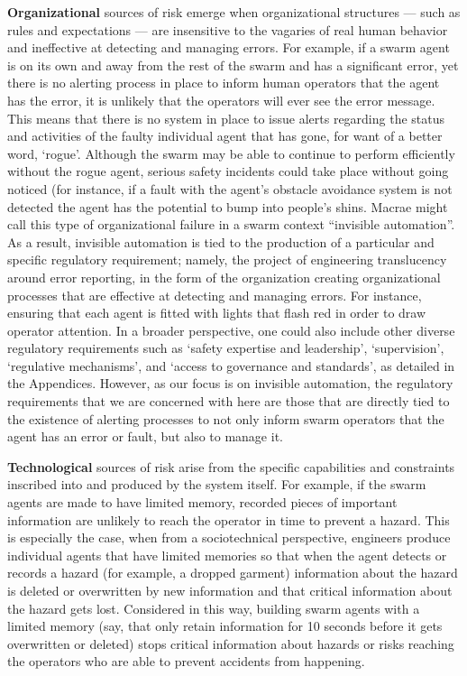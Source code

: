 \documentclass[lettersize,journal]{IEEEtran}
\begin{document}
\textbf{Organizational} sources of risk emerge when organizational structures — such as rules and expectations — are insensitive to the vagaries of real human behavior and ineffective at detecting and managing errors. For example, if a swarm agent is on its own and away from the rest of the swarm and has a significant error, yet there is no alerting process in place to inform human operators that the agent has the error, it is unlikely that the operators will ever see the error message. This means that there is no system in place to issue alerts regarding the status and activities of the faulty individual agent that has gone, for want of a better word, `rogue’. Although the swarm may be able to continue to perform efficiently without the rogue agent, serious safety incidents could take place without going noticed (for instance, if a fault with the agent’s obstacle avoidance system is not detected the agent has the potential to bump into people’s shins. Macrae \cite{macrae2021learning} might call this type of organizational failure in a swarm context ``invisible automation”. As a result, invisible automation is tied to the production of a particular and specific regulatory requirement; namely, the project of engineering translucency around error reporting, in the form of the organization creating organizational processes that are effective at detecting and managing errors. For instance, ensuring that each agent is fitted with lights that flash red in order to draw operator attention. In a broader perspective, one could also include other diverse regulatory requirements such as `safety expertise and leadership’, `supervision’, `regulative mechanisms’, and `access to governance and standards', as detailed in the Appendices. However, as our focus is on invisible automation, the regulatory requirements that we are concerned with here are those that are directly tied to the existence of alerting processes to not only inform swarm operators that the agent has an error or fault, but also to manage it.

\textbf{Technological} sources of risk arise from the specific capabilities and constraints inscribed into and produced by the system itself. For example, if the swarm agents are made to have limited memory, recorded pieces of important information are unlikely to reach the operator in time to prevent a hazard. This is especially the case, when from a sociotechnical perspective, engineers produce individual agents that have limited memories so that when the agent detects or records a hazard (for example, a dropped garment) information about the hazard is deleted or overwritten by new information and that critical information about the hazard gets lost. Considered in this way, building swarm agents with a limited memory (say, that only retain information for 10 seconds before it gets overwritten or deleted) stops critical information about hazards or risks reaching the operators who are able to prevent accidents from happening. 
\end{document}
